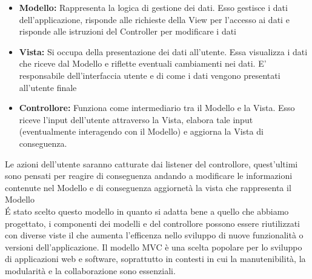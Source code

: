 \documentclass[a4paper, 11pt,oneside]{book}
\newcommand{\spacing}{\par\bigskip\noindent}
\begin{document}
    \begin{itemize}
        \item \textbf{Modello:} Rappresenta la logica di gestione dei dati. Esso gestisce i dati dell'applicazione, risponde alle richieste della View per l'accesso ai dati e risponde alle istruzioni del Controller per modificare i dati
        \item \textbf{Vista:} Si occupa della presentazione dei dati all'utente. Essa visualizza i dati che riceve dal Modello e riflette eventuali cambiamenti nei dati. E' responsabile dell'interfaccia utente e di come i dati vengono presentati all'utente finale
        \item \textbf{Controllore:} Funziona come intermediario tra il Modello e la Vista. Esso riceve l'input dell'utente attraverso la Vista, elabora tale input (eventualmente interagendo con il Modello) e aggiorna la Vista di conseguenza.
    \end{itemize}
    Le azioni dell'utente saranno catturate dai listener del controllore, quest'ultimi sono pensati per reagire di conseguenza andando a modificare le informazioni contenute nel Modello e di conseguenza aggiornetà la vista che rappresenta il Modello\\
    \'E stato scelto questo modello in quanto si adatta bene a quello che abbiamo progettato, i componenti dei modelli e del controllore possono essere riutilizzati con diverse viste il che aumenta l'efficenza nello sviluppo di nuove funzionalità o versioni dell'applicazione. Il modello MVC è una scelta popolare per lo sviluppo di applicazioni web 
    e software, soprattutto in contesti in cui la manutenibilità, la modularità e la collaborazione sono essenziali.
    \spacing
    

\end{document}
